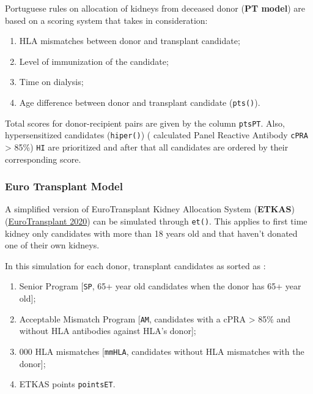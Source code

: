 \documentclass[
]{article}
\providecommand{\tightlist}{%
  \setlength{\itemsep}{0pt}\setlength{\parskip}{0pt}}
\begin{document}
Portuguese rules on allocation of kidneys from deceased donor
(\textbf{PT model}) are based on a scoring system that takes in
consideration:

\begin{enumerate}
\def\labelenumi{\arabic{enumi}.}
\tightlist
\item
  HLA mismatches between donor and transplant candidate;
\item
  Level of immunization of the candidate;
\item
  Time on dialysis;
\item
  Age difference between donor and transplant candidate
  (\texttt{pts()}).
\end{enumerate}

Total scores for donor-recipient pairs are given by the column
\texttt{ptsPT}. Also, hypersensitized candidates (\texttt{hiper()}) (
calculated Panel Reactive Antibody \texttt{cPRA} \textgreater{} 85\%)
\texttt{HI} are prioritized and after that all candidates are ordered by
their corresponding score.

\hypertarget{euro-transplant-model}{%
\subsubsection{Euro Transplant Model}\label{euro-transplant-model}}

A simplified version of EuroTransplant Kidney Allocation System
(\textbf{ETKAS}) (\protect\hyperlink{ref-ET}{EuroTransplant 2020}) can
be simulated through \texttt{et()}. This applies to first time kidney
only candidates with more than 18 years old and that haven't donated one
of their own kidneys.

In this simulation for each donor, transplant candidates as sorted as :

\begin{enumerate}
\def\labelenumi{\arabic{enumi}.}
\tightlist
\item
  Senior Program {[}\texttt{SP}, 65+ year old candidates when the donor
  has 65+ year old{]};
\item
  Acceptable Mismatch Program {[}\texttt{AM}, candidates with a cPRA
  \textgreater{} 85\% and without HLA antibodies against HLA's donor{]};
\item
  000 HLA mismatches {[}\texttt{mmHLA}, candidates without HLA
  mismatches with the donor{]};
\item
  ETKAS points \texttt{pointsET}.
\end{enumerate}
\end{document}
